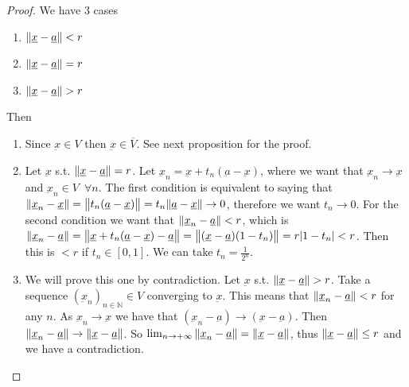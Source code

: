 \documentclass[10pt]{extarticle}
\newcommand{\N}{\mathbb{N}}
\newcommand{\munderbar}[1]{\underbar{\ensuremath{#1}}}
\begin{document}
                \begin{proof}
                    We have 3 cases

                    \begin{enumerate}
                        \item $\norm{\munderbar{x} - \munderbar{a}} < r$
                        \item $\norm{\munderbar{x} - \munderbar{a}} = r$
                        \item $\norm{\munderbar{x} - \munderbar{a}} > r$
                    \end{enumerate}

                    Then

                    \begin{enumerate}
                        \item Since $\munderbar{x} \in V$ then $\munderbar{x} \in \overline{V}$. See next proposition for the proof.
                        \item Let $\munderbar{x}$ s.t. $\norm{\munderbar{x} - \munderbar{a}} = r$.
                              Let $\munderbar{x}_n = \munderbar{x} + t_n(\munderbar{a} - \munderbar{x})$, where we want that $\munderbar{x}_n \to \munderbar{x}$ and $\munderbar{x}_n \in V \enspace \forall n$.
                              The first condition is equivalent to saying that $\norm{\munderbar{x}_n - \munderbar{x}} = \norm{t_n(\munderbar{a} - \munderbar{x})} = t_n \norm{\munderbar{a} - \munderbar{x}} \to 0$, therefore we want $t_n \to 0$.
                              For the second condition we want that $\norm{\munderbar{x}_n - \munderbar{a}} < r$, which is
                              $\norm{\munderbar{x}_n - \munderbar{a}} = \norm{\munderbar{x} + t_n(\munderbar{a} - \munderbar{x}) - \munderbar{a}} = \norm{(\munderbar{x} - \munderbar{a})(1 - t_n)} = r \abs{1 - t_n} < r$. Then this is $< r$ if $t_n \in [0, 1]$.
                              We can take $t_n = \frac{1}{2^n}$.
                        \item We will prove this one by contradiction. Let $\munderbar{x}$ s.t. $\norm{\munderbar{x} - \munderbar{a}} > r$.
                              Take a sequence $\left(\munderbar{x}_n\right)_{n \in \N} \in V$ converging to $\munderbar{x}$.
                              This means that $\norm{\munderbar{x}_n - \munderbar{a}} < r$ for any $n$.
                              As $\munderbar{x}_n \to \munderbar{x}$ we have that $(\munderbar{x}_n - \munderbar{a}) \to (\munderbar{x} - \munderbar{a})$.
                              Then $\norm{\munderbar{x}_n - \munderbar{a}} \to \norm{\munderbar{x} - \munderbar{a}}$.
                              So $\lim_{n \to +\infty} \norm{\munderbar{x}_n - \munderbar{a}} = \norm{\munderbar{x} - \munderbar{a}}$, thus $\norm{\munderbar{x} - \munderbar{a}} \leq r$ and we have a contradiction.
                    \end{enumerate}
                \end{proof}
\end{document}
